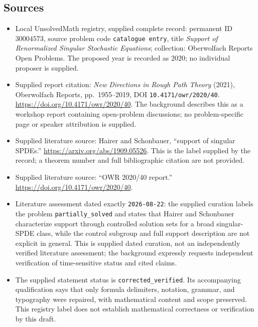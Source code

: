 \documentclass[11pt]{article}
\begin{document}
\subsection{Sources}
\begin{itemize}
\item Local UnsolvedMath registry, supplied complete record: permanent ID \(30004573\), source problem code \texttt{catalogue entry}, title \emph{Support of Renormalized Singular Stochastic Equations}; collection: Oberwolfach Reports Open Problems. The proposed year is recorded as \(2020\); no individual proposer is supplied.
\item Supplied report citation: \emph{New Directions in Rough Path Theory} (2021), Oberwolfach Reports, pp.~1955--2019, DOI \texttt{10.4171/owr/2020/40}. \url{https://doi.org/10.4171/owr/2020/40}. The background describes this as a workshop report containing open-problem discussions; no problem-specific page or speaker attribution is supplied.
\item Supplied literature source: Hairer and Schonbauer, ``support of singular SPDEs.'' \url{https://arxiv.org/abs/1909.05526}. This is the label supplied by the record; a theorem number and full bibliographic citation are not provided.
\item Supplied literature source: ``OWR 2020/40 report.'' \url{https://doi.org/10.4171/owr/2020/40}.
\item Literature assessment dated exactly \texttt{2026-08-22}: the supplied curation labels the problem \texttt{partially\_solved} and states that Hairer and Schonbauer characterize support through controlled solution sets for a broad singular-SPDE class, while the control subgroup and full support description are not explicit in general. This is supplied dated curation, not an independently verified literature assessment; the background expressly requests independent verification of time-sensitive status and cited claims.
\item The supplied statement status is \texttt{corrected\_verified}. Its accompanying qualification says that only formula delimiters, notation, grammar, and typography were repaired, with mathematical content and scope preserved. This registry label does not establish mathematical correctness or verification by this draft.
\end{itemize}
\end{document}
